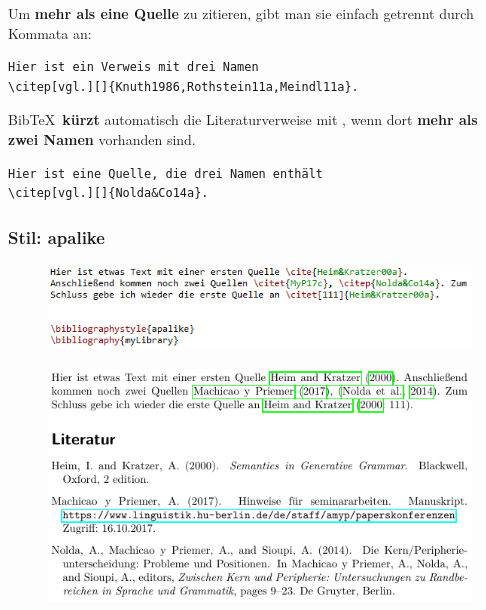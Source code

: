 \begin{frame}[fragile]

Um \textbf{mehr als eine Quelle} zu zitieren, gibt man sie einfach getrennt durch Kommata an:

\begin{lstlisting}
Hier ist ein Verweis mit drei Namen
\citep[vgl.][]{Knuth1986,Rothstein11a,Meindl11a}.
\end{lstlisting}

\vspace{1em}


\pause 


Bib\TeX\ \textbf{kürzt} automatisch die Literaturverweise mit , wenn dort \textbf{mehr als zwei Namen} vorhanden sind.

\begin{lstlisting}
Hier ist eine Quelle, die drei Namen enthält
\citep[vgl.][]{Nolda&Co14a}.
\end{lstlisting}


\end{frame}



\begin{frame}[fragile]
\frametitle{Stil: apalike}


\begin{figure}
	\centering
	\includegraphics[width=.70\textwidth]{../../texfiles-beamer/tex-material/WissArb-latex/bib_apalike_tex}
\end{figure}

\begin{figure}
	\centering
	\includegraphics[width=.70\textwidth]{../../texfiles-beamer/tex-material/WissArb-latex/bib_apalike_pdf}
\end{figure}

\end{frame}


